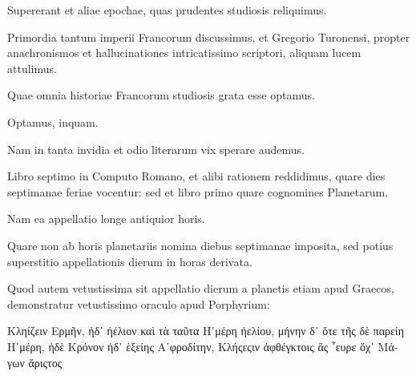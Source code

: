 \begin{parnumbers}
Supererant et aliae epochae, quas
prudentes studiosis reliquimus.

Primordia tantum imperii Francorum
discussimus, et Gregorio Turonensi, propter anachronismos
et hallucinationes intricatissimo scriptori, aliquam lucem attulimus.

Quae omnia historiae Francorum studiosis grata esse optamus.

Optamus, inquam.

Nam in tanta invidia et odio literarum
vix sperare audemus.

Libro septimo in Computo Romano, et alibi
rationem reddidimus, quare dies septimanae feriae vocentur: sed
et libro primo quare cognomines Planetarum.

Nam ea appellatio longe antiquior horis.

Quare non ab horis planetariis nomina diebus
septimanae imposita, sed potius superstitio appellationis dierum
in horas derivata.

Quod autem vetustissima sit appellatio dierum
a planetis etiam apud Graecos, demonstratur vetustissimo oraculo
apud Porphyrium:

%
%
%
	\textgreek{Κληίζειν Ερμῆν, ἠδ᾿ ἠέλιον καὶ τὰ ταῦτα}
	\textgreek{Η῾μέρη ἠελίου, μήνην δ᾿ ὅτε τῆς δὲ παρείη}
	\textgreek{Η῾μέρη, ἠδὲ Κρόνον ἠδ᾿ ἑξείης Α᾿φροδίτην},
%
	\textgreek{Κλήςεςιν ἀφθέγκτοις ἃς ῟ευρε ὄχ᾿ Μάγων ἄριςτος}


\end{parnumbers}
